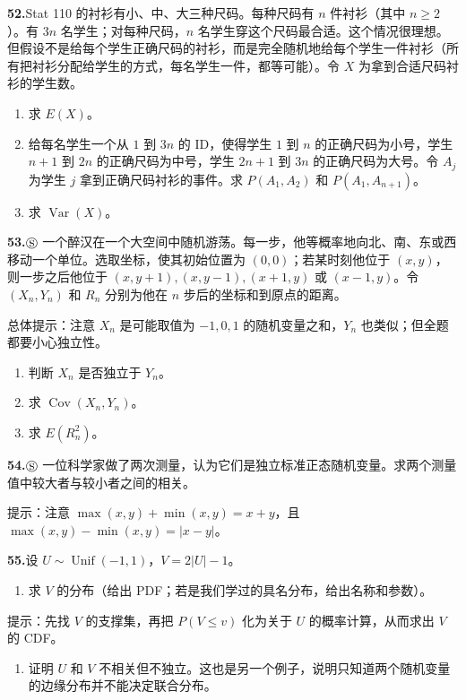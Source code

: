 \documentclass[UTF8, 12pt, fontset=fandol, oneside]{ctexart}
\begin{document}
\noindent\textbf{52.}\quad Stat 110 的衬衫有小、中、大三种尺码。每种尺码有 $n$ 件衬衫（其中 $n\ge 2$）。有 $3n$ 名学生；对每种尺码，$n$ 名学生穿这个尺码最合适。这个情况很理想。但假设不是给每个学生正确尺码的衬衫，而是完全随机地给每个学生一件衬衫（所有把衬衫分配给学生的方式，每名学生一件，都等可能）。令 $X$ 为拿到合适尺码衬衫的学生数。
\begin{enumerate}
  \item[(a)] 求 $E(X)$。
  \item[(b)] 给每名学生一个从 $1$ 到 $3n$ 的 ID，使得学生 $1$ 到 $n$ 的正确尺码为小号，学生 $n+1$ 到 $2n$ 的正确尺码为中号，学生 $2n+1$ 到 $3n$ 的正确尺码为大号。令 $A_j$ 为学生 $j$ 拿到正确尺码衬衫的事件。求 $P(A_1,A_2)$ 和 $P(A_1,A_{n+1})$。
  \item[(c)] 求 $\operatorname{Var}(X)$。
\end{enumerate}

\noindent\textbf{53.}\quad $\circledS$ 一个醉汉在一个大空间中随机游荡。每一步，他等概率地向北、南、东或西移动一个单位。选取坐标，使其初始位置为 $(0,0)$；若某时刻他位于 $(x,y)$，则一步之后他位于 $(x,y+1),(x,y-1),(x+1,y)$ 或 $(x-1,y)$。令 $(X_n,Y_n)$ 和 $R_n$ 分别为他在 $n$ 步后的坐标和到原点的距离。

总体提示：注意 $X_n$ 是可能取值为 $-1,0,1$ 的随机变量之和，$Y_n$ 也类似；但全题都要小心独立性。
\begin{enumerate}
  \item[(a)] 判断 $X_n$ 是否独立于 $Y_n$。
  \item[(b)] 求 $\operatorname{Cov}(X_n,Y_n)$。
  \item[(c)] 求 $E(R_n^2)$。
\end{enumerate}

\noindent\textbf{54.}\quad $\circledS$ 一位科学家做了两次测量，认为它们是独立标准正态随机变量。求两个测量值中较大者与较小者之间的相关。

提示：注意 $\max(x,y)+\min(x,y)=x+y$，且 $\max(x,y)-\min(x,y)=|x-y|$。

\noindent\textbf{55.}\quad 设 $U\sim \operatorname{Unif}(-1,1)$，$V=2|U|-1$。
\begin{enumerate}
  \item[(a)] 求 $V$ 的分布（给出 PDF；若是我们学过的具名分布，给出名称和参数）。
\end{enumerate}
提示：先找 $V$ 的支撑集，再把 $P(V\le v)$ 化为关于 $U$ 的概率计算，从而求出 $V$ 的 CDF。
\begin{enumerate}
  \item[(b)] 证明 $U$ 和 $V$ 不相关但不独立。这也是另一个例子，说明只知道两个随机变量的边缘分布并不能决定联合分布。
\end{enumerate}
\end{document}
